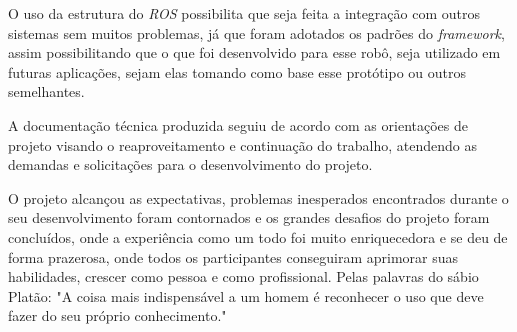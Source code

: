 O uso da estrutura do \textit{ROS} possibilita que seja feita a integração com outros sistemas sem muitos problemas, já que foram adotados os padrões do \textit{framework}, assim possibilitando que o que foi desenvolvido para esse robô, seja utilizado em futuras aplicações, sejam elas tomando como base esse protótipo ou outros semelhantes.

A documentação técnica produzida seguiu de acordo com as orientações de projeto visando o reaproveitamento e continuação do trabalho, atendendo as demandas e solicitações para o desenvolvimento do projeto.

O projeto alcançou as expectativas, problemas inesperados encontrados durante o seu desenvolvimento foram contornados e os grandes desafios do projeto foram concluídos, onde a experiência como um todo foi muito enriquecedora e se deu de forma prazerosa, onde todos os participantes conseguiram aprimorar suas habilidades, crescer como pessoa e como profissional. Pelas palavras do sábio Platão: "A coisa mais indispensável a um homem é reconhecer o uso que deve fazer do seu próprio conhecimento."
	
